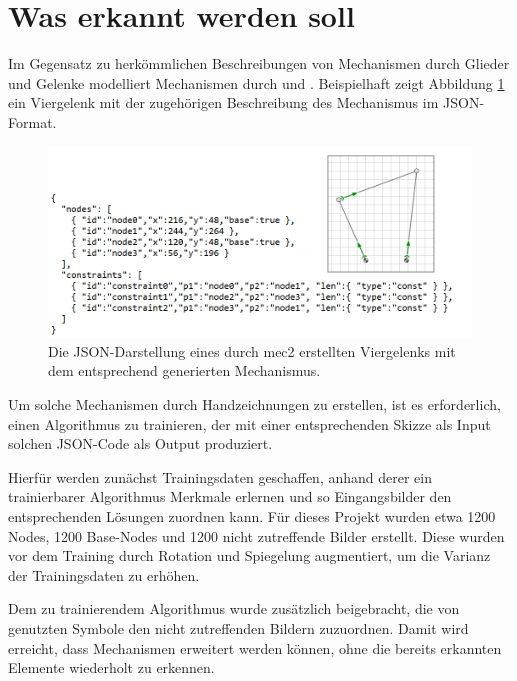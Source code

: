\section{Was erkannt werden soll}
Im Gegensatz zu herkömmlichen Beschreibungen von Mechanismen durch Glieder und Gelenke modelliert  Mechanismen durch  und  \cite{Goessner2019a}.
Beispielhaft zeigt Abbildung \ref{fig:4bar} ein Viergelenk mit der zugehörigen Beschreibung des Mechanismus im JSON-Format.

\begin{figure}
  \includegraphics[width=\textwidth]{images/4bar_json}
  \caption{Die JSON-Darstellung eines durch mec2 erstellten Viergelenks mit dem entsprechend generierten Mechanismus.}
  \label{fig:4bar}
\end{figure}

Um solche Mechanismen durch Handzeichnungen zu erstellen, ist es erforderlich, einen Algorithmus zu trainieren, der mit einer entsprechenden Skizze als Input solchen JSON-Code als Output produziert.

Hierfür werden zunächst Trainingsdaten geschaffen, anhand derer ein trainierbarer Algorithmus Merkmale erlernen und so Eingangsbilder den entsprechenden Lösungen zuordnen kann.
Für dieses Projekt wurden etwa 1200 Nodes, 1200 Base-Nodes und 1200 nicht zutreffende Bilder erstellt.
Diese wurden vor dem Training durch Rotation und Spiegelung augmentiert, um die Varianz der Trainingsdaten zu erhöhen.

Dem zu trainierendem Algorithmus wurde zusätzlich beigebracht, die von  genutzten Symbole den nicht zutreffenden Bildern zuzuordnen.
Damit wird erreicht, dass Mechanismen erweitert werden können, ohne die bereits erkannten Elemente wiederholt zu erkennen.

